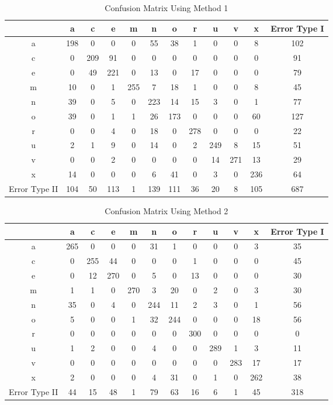 \documentclass[12pt]{article}
\begin{document}
\begin{table}[!ht]
    \centering
    \caption{Confusion Matrix Using Method 1}
    \begin{tabular}{| c | c | c | c | c | c | c | c | c | c | c | c |} \hline
        & a & c & e & m & n & o & r & u & v & x & Error Type I\\ \hline
      a & 198 & 0 & 0 & 0 & 55 & 38 & 1 & 0 & 0 & 8 & 102\\ \hline
      c & 0 & 209 & 91 & 0 & 0 & 0 & 0 & 0 & 0 & 0 & 91\\ \hline
      e & 0 & 49 & 221 & 0 & 13 & 0 & 17 & 0 & 0 & 0 & 79\\ \hline
      m & 10 & 0 & 1 & 255 & 7 & 18 & 1 & 0 & 0 & 8 & 45\\ \hline
      n & 39 & 0 & 5 & 0 & 223 & 14 & 15 & 3 & 0 & 1 & 77\\ \hline
      o & 39 & 0 & 1 & 1 & 26 & 173 & 0 & 0 & 0 & 60 & 127\\ \hline
      r & 0 & 0 & 4 & 0 & 18 & 0 & 278 & 0 & 0 & 0 & 22\\ \hline
      u & 2 & 1 & 9 & 0 & 14 & 0 & 2 & 249 & 8 & 15 & 51\\ \hline
      v & 0 & 0 & 2 & 0 & 0 & 0 & 0 & 14 & 271 & 13 & 29\\ \hline
      x & 14 & 0 & 0 & 0 & 6 & 41 & 0 & 3 & 0 & 236 & 64\\ \hline
Error Type II & 104 & 50 & 113 & 1 & 139 & 111 & 36 & 20 & 8 & 105 & 687\\ \hline
    \end{tabular}
\end{table}

\begin{table}[!ht]
    \centering
    \caption{Confusion Matrix Using Method 2}
    \begin{tabular}{| c | c | c | c | c | c | c | c | c | c | c | c |} \hline
        & a & c & e & m & n & o & r & u & v & x & Error Type I\\ \hline
      a & 265 & 0 & 0 & 0 & 31 & 1 & 0 & 0 & 0 & 3 & 35\\ \hline
      c & 0 & 255 & 44 & 0 & 0 & 0 & 1 & 0 & 0 & 0 & 45\\ \hline
      e & 0 & 12 & 270 & 0 & 5 & 0 & 13 & 0 & 0 & 0 & 30\\ \hline
      m & 1 & 1 & 0 & 270 & 3 & 20 & 0 & 2 & 0 & 3 & 30\\ \hline
      n & 35 & 0 & 4 & 0 & 244 & 11 & 2 & 3 & 0 & 1 & 56\\ \hline
      o & 5 & 0 & 0 & 1 & 32 & 244 & 0 & 0 & 0 & 18 & 56\\ \hline
      r & 0 & 0 & 0 & 0 & 0 & 0 & 300 & 0 & 0 & 0 & 0\\ \hline
      u & 1 & 2 & 0 & 0 & 4 & 0 & 0 & 289 & 1 & 3 & 11\\ \hline
      v & 0 & 0 & 0 & 0 & 0 & 0 & 0 & 0 & 283 & 17 & 17\\ \hline
      x & 2 & 0 & 0 & 0 & 4 & 31 & 0 & 1 & 0 & 262 & 38\\ \hline
Error Type II & 44 & 15 & 48 & 1 & 79 & 63 & 16 & 6 & 1 & 45 & 318\\ \hline
    \end{tabular}
\end{table}
\end{document}
